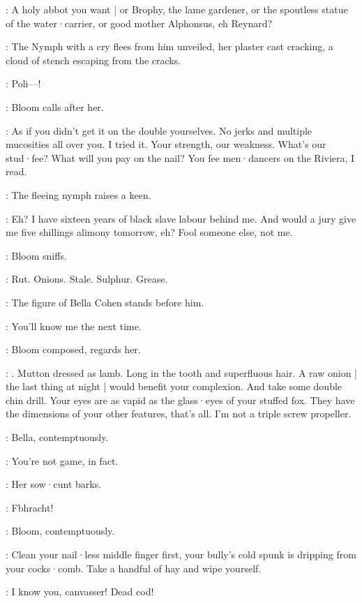 \Bloom:
A holy abbot you want |
or Brophy,
the lame gardener,
or the spoutless statue of the water·carrier,
or good mother Alphonsus,
eh Reynard?

:
The Nymph with a cry flees from him unveiled,
her plaster cast cracking,
a cloud of stench escaping from the cracks.

\Nymph:
Poli---!

:
Bloom calls after her.

\Bloom:
As if you didn't get it on the double yourselves.
No jerks and multiple mucosities all over you.
I tried it.
Your strength,
our weakness.
What's our stud·fee?
What will you pay on the nail?
You fee men·dancers on the Riviera,
I read.

:
The fleeing nymph raises a keen.

\Bloom:
Eh?
I have sixteen years of black slave labour behind me.
And would a jury give me five shillings alimony tomorrow,
eh?
Fool someone else,
not me.

:
Bloom sniffs.

\Bloom:
Rut. Onions. Stale. Sulphur. Grease.


:
The figure of Bella Cohen stands before him.

\Bella:
You'll know me the next time.

:
Bloom composed,
regards her.

\Bloom:
.
Mutton dressed as lamb.
Long in the tooth and superfluous hair.
A raw onion |
the last thing at night |
would benefit your complexion.
And take some double chin drill.
Your eyes are as vapid as the glass·eyes of your stuffed fox.
They have the dimensions of your other features,
that's all.
I'm not a triple screw propeller.

:
Bella,
contemptuously.

\Bella:
You're not game,
in fact.

:
Her sow·cunt barks.

\Bella:
Fbhracht!%

:
Bloom,
contemptuously.

\Bloom:
Clean your nail·less middle finger first,
your bully's cold spunk is dripping from your cocks·comb.
Take a handful of hay and wipe yourself.

\Bella:
I know you,
canvasser!
Dead cod!

